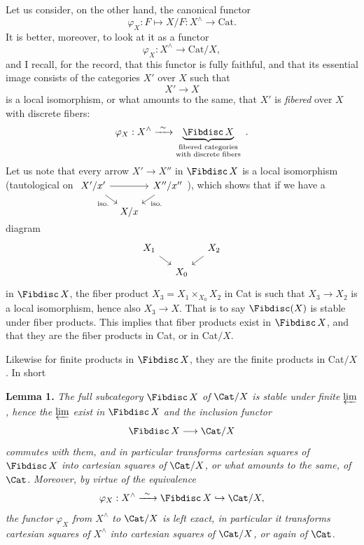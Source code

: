 Let us consider, on the other hand, the canonical functor
\[
\varphi_X : F \longmapsto X/F : X^{\wedge} \longrightarrow \mathrm{Cat}.
\]
It is better, moreover, to look at it as a functor
\[
\varphi_X : X^{\wedge} \longrightarrow \mathrm{Cat}/X,
\]
and I recall, for the record, that this functor is fully faithful, and that its essential image consists of the categories $X'$ over $X$ such that
\[
X' \longrightarrow X
\]
is a local isomorphism, or what amounts to the same, that $X'$ is \textit{fibered} over $X$ with discrete fibers:
\[
\varphi_X : X^{\wedge} \xrightarrow{\ \sim\ } \underbrace{\Fibdisc\, X}_{\substack{\text{fibered categories}\\ \text{with discrete fibers}}} \ .
\]
Let us note that every arrow $X' \longrightarrow X''$ in $\Fibdisc\, X$ is a local isomorphism (tautological on $\begin{tikzcd}[ampersand replacement=\&, row sep=small, column sep=tiny, baseline=(\tikzcdmatrixname-1-1.base)] X'/x' \ar[rr] \ar[dr, "\text{iso.}"'] \& \& X''/x'' \ar[dl, "\text{iso.}"] \\ \& X/x \& \end{tikzcd}$), which shows that if we have a diagram
\[
\begin{tikzcd}[row sep=small, column sep=small]
X_1 \ar[dr] & & X_2 \ar[dl] \\
& X_0 &
\end{tikzcd}
\]
in $\Fibdisc\, X$, the fiber product $X_3 = X_1 \times_{X_0} X_2$ in Cat is such that $X_3 \longrightarrow X_2$ is a local isomorphism, hence also $X_3 \longrightarrow X$. That is to say $\Fibdisc(X)$ is stable under fiber products. This implies that fiber products exist in $\Fibdisc\, X$, and that they are the fiber products in Cat, or in Cat$/X$.

Likewise for finite products in $\Fibdisc\, X$, they are the finite products in Cat$/X$. In short

\textbf{Lemma 1.} \textit{The full subcategory} $\Fibdisc\, X$ \textit{of} $\Cat/X$ \textit{is stable under finite} $\varprojlim$\textit{, hence the} $\varprojlim$ \textit{exist in} $\Fibdisc\, X$ \textit{and the inclusion functor}
\[
\Fibdisc\, X \longrightarrow \Cat/X
\]
\textit{commutes with them, and in particular transforms cartesian squares of} $\Fibdisc\, X$ \textit{into cartesian squares of} $\Cat/X$\textit{, or what amounts to the same, of} $\Cat$\textit{. Moreover, by virtue of the equivalence}
\[
\varphi_X : X^{\wedge} \xrightarrow{\ \sim\ } \Fibdisc\, X \hookrightarrow \Cat/X,
\]
\textit{the functor $\varphi_X$ from $X^{\wedge}$ to} $\Cat/X$ \textit{is left exact, in particular it transforms cartesian squares of $X^{\wedge}$ into cartesian squares of} $\Cat/X$\textit{, or again of} $\Cat$\textit{.} %

